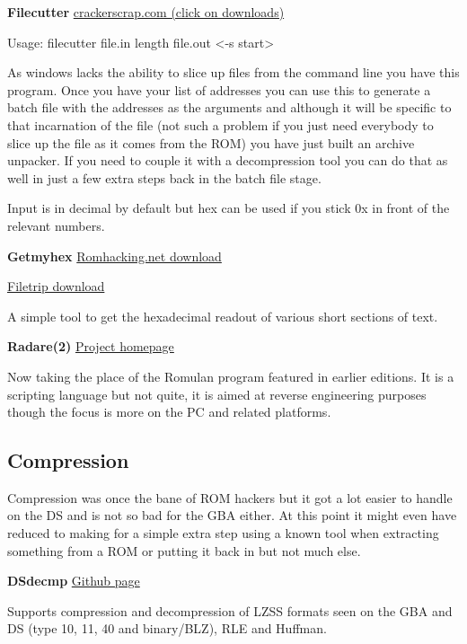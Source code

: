 \documentclass[
]{book}
\begin{document}
\textbf{Filecutter} \href{http://crackerscrap.com/}{crackerscrap.com (click on downloads)}

Usage: filecutter file.in length file.out \textless-s start\textgreater{}

As windows lacks the ability to slice up files from the command line you have this program. Once you have your list of addresses you can use this to generate a batch file with the addresses as the arguments and although it will be specific to that incarnation of the file (not such a problem if you just need everybody to slice up the file as it comes from the ROM) you have just built an archive unpacker. If you need to couple it with a decompression tool you can do that as well in just a few extra steps back in the batch file stage.

Input is in decimal by default but hex can be used if you stick 0x in front of the relevant numbers.

\textbf{Getmyhex} \href{http://www.romhacking.net/utilities/504/}{Romhacking.net download}

\href{http://filetrip.net/pc-downloads/applications/download-getmyhex-1500-f29200.html}{Filetrip download}

A simple tool to get the hexadecimal readout of various short sections of text.

\textbf{Radare(2)} \href{http://radare.org/y/}{Project homepage}

Now taking the place of the Romulan program featured in earlier editions. It is a scripting language but not quite, it is aimed at reverse engineering purposes though the focus is more on the PC and related platforms.

\hypertarget{compression}{%
\subsection{Compression}\label{compression}}

Compression was once the bane of ROM hackers but it got a lot easier to handle on the DS and is not so bad for the GBA either. At this point it might even have reduced to making for a simple extra step using a known tool when extracting something from a ROM or putting it back in but not much else.

\textbf{DSdecmp} \href{https://github.com/barubary/dsdecmp}{Github page}

Supports compression and decompression of LZSS formats seen on the GBA and DS (type 10, 11, 40 and binary/BLZ), RLE and Huffman.
\end{document}

